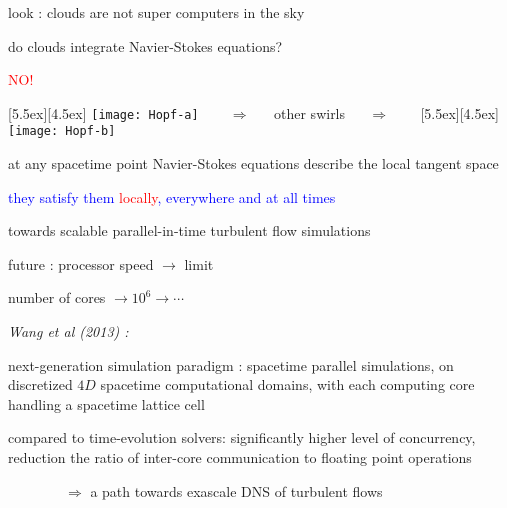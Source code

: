 \begin{frame}{look : clouds are not super computers in the sky}

do clouds integrate Navier-Stokes equations?

\begin{center}
\centerline{\textcolor{red}{\Huge NO!}}

\begin{minipage}[t]{\textwidth}
	\begin{center}
\centerline{
\raisebox{-4.0ex}[5.5ex][4.5ex]
		 {\texttt{[image: Hopf-a]}}
~~~ $\Longrightarrow$ ~~ {other swirls} ~~ $\Longrightarrow$ ~~~
	\raisebox{-4.0ex}[5.5ex][4.5ex]
		 {\texttt{[image: Hopf-b]}}
          }
	\end{center}
\end{minipage}
\end{center}

at any spacetime point Navier-Stokes equations describe the local tangent space

\bigskip

\centerline{
\textcolor{blue}{they satisfy them \textcolor{red}{\large locally}, everywhere and at all times}
}
\end{frame}

\begin{frame}{
towards scalable parallel-in-time turbulent flow simulations
}
\begin{block}{future :}%
processor speed $\to$ limit

\medskip

number of cores $\to 10^6 \to \cdots$

\medskip
\end{block}

\emph{Wang et al (2013)
    :} %

next-generation simulation paradigm : spacetime parallel
simulations, on discretized $4D$ spacetime
computational domains, with each computing core handling a spacetime lattice cell

\bigskip

compared to time-evolution solvers:
significantly higher level of concurrency, reduction the ratio of
inter-core communication to floating point operations

\bigskip

$\qquad\qquad\Rightarrow$ a path towards exascale DNS of turbulent flows
\end{frame}


